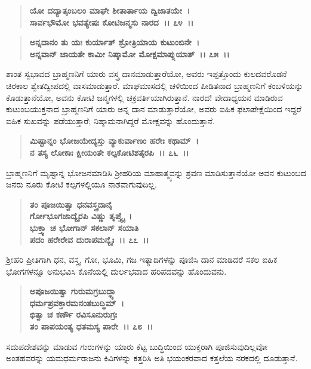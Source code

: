 \begin{verse}
\textbf{ಯೋ ದದ್ಯಾತ್ಕಂಬಲಂ ಮಾಘೇ ಶೀತಾರ್ತಾಯ ದ್ವಿಜಾತಯೇ~।}\\\textbf{ಸಾರ್ವಭೌಮೋ ಭವತ್ಯೇಷಃ ಕೋಟಿಜನ್ಮಸು ನಾರದ~।। ೭೪~।।} 
\end{verse}

\begin{verse}
\textbf{ಅನ್ನದಾನಂ ತು ಯಃ ಕುರ್ಯಾತ್ ಶ್ರೋತ್ರಿಯಾಯ ಕುಟುಂಬಿನೇ~।}\\\textbf{ಅನ್ನವಾನ್ ಜಾಯತೇ ಕಾಮೀ ನಿಷ್ಕಾಮೋ ಮೋಕ್ಷಮಾಪ್ನುಯಾತ್~।। ೭೫~।।}
\end{verse}

ಶಾಂತ ಸ್ವಭಾವದ ಬ್ರಾಹ್ಮಣನಿಗೆ ಯಾರು ವಸ್ತ್ರ ದಾನಮಾಡುತ್ತಾರೆಯೋ, ಅವರು ಇಪ್ಪತ್ತೊಂದು ಕುಲದವರೊಡನೆ ಚಿರಕಾಲ ಶ್ವೇತದ್ವೀಪದಲ್ಲಿ ವಾಸಮಾಡುತ್ತಾರೆ. ಮಾಘಮಾಸದಲ್ಲಿ ಚಳಿಯಿಂದ ಪೀಡಿತನಾದ ಬ್ರಾಹ್ಮಣನಿಗೆ ಕಂಬಳಿಯನ್ನು ಕೊಡುತ್ತಾನೆಯೋ, ಅವನು ಕೋಟಿ ಜನ್ಮಗಳಲ್ಲಿ ಚಕ್ರವರ್ತಿಯಾಗಿರುತ್ತಾನೆ. ನಾರದ! ವೇದಾಧ್ಯಯನ ಮಾಡಿರುವ ಕುಟುಂಬಯುಕ್ತನಾದ ಬ್ರಾಹ್ಮಣನಿಗೆ ಯಾರು ಅನ್ನ ದಾನ ಮಾಡುತ್ತಾರೆಯೋ, ಅವರು ಐಹಿಕ ಫಲಾಪೇಕ್ಷೆಯಿಂದ ಇದ್ದರೆ ಐಹಿಕ ಸುಖವನ್ನು ಪಡೆಯುತ್ತಾರೆ; ನಿಷ್ಕಾಮನಾಗಿದ್ದರೆ ಮೋಕ್ಷವನ್ನು ಹೊಂದುತ್ತಾನೆ.

\begin{verse}
\textbf{ಮಿಷ್ಟಾನ್ನಂ ಭೋಜಯೇದ್ಯಸ್ತು ವ್ಯಾಕುರ್ವಾಣಂ ಹರೇಃ ಕಥಾಮ್~।}\\\textbf{ನ ತಸ್ಯ ಲೋಕಾಃ ಕ್ಷೀಯಂತೇ ಕಲ್ಪಕೋಟಿಶತೈರಪಿ~।। ೭೬~।।}
\end{verse}

ಬ್ರಾಹ್ಮಣನಿಗೆ ಮೃಷ್ಟಾನ್ನ ಭೋಜನಮಾಡಿಸಿ ಶ‍್ರೀಹರಿಯ ಮಾಹಾತ್ಮ್ಯವನ್ನು ಶ್ರವಣ ಮಾಡಿಸುತ್ತಾನೆಯೋ ಅವನ ಕುಟುಂಬದ ಜನರು ನೂರು ಕೋಟಿ ಕಲ್ಪಗಳಲ್ಲಿಯೂ ನಾಶವಾಗುವುದಿಲ್ಲ.

\begin{verse}
\textbf{ತಂ ಪೂಜಯಿತ್ವಾ ಧನವಸ್ತ್ರದಾನೈ}\\\textbf{ರ್ಗೋಭೂಗಜಾದ್ಯೈರಪಿ ವಿಷ್ಣು ತೃಪ್ತ್ಯೈ~। }\\\textbf{ಭುಕ್ತ್ವಾ ಚ ಭೋಗಾನ್ ಸಕಲಾನ್ ಸಯಾತಿ} \\\textbf{ಪದಂ ಹರೇರೇವ ದುರಾಪಮನ್ಯೈಃ~।। ೭೭~।।}
\end{verse}

ಶ‍್ರೀಹರಿ ಪ್ರೀತಿಗಾಗಿ ಧನ, ವಸ್ತ್ರ, ಗೋ, ಭೂಮಿ, ಗಜ ಇತ್ಯಾದಿಗಳನ್ನು ಪೂಜಿಸಿ ದಾನ ಮಾಡಿದರೆ ಸಕಲ ಐಹಿಕ ಭೋಗಗಳನ್ನೂ ಅನುಭವಿಸಿ ಕೊನೆಯಲ್ಲಿ ದುರ್ಲಭವಾದ ಹರಿಪದವನ್ನು ಹೊಂದುವನು.

\begin{verse}
\textbf{ಅಪೂಜಯಿತ್ವಾ ಗುರುಮಗ್ರಬುದ್ಧ್ಯಾ}\\\textbf{ಧರ್ಮಪ್ರವಕ್ತಾರಮನಂತಬುದ್ಧಿಮ್~।}\\\textbf{ಛಿತ್ವಾ ಚ ಕರ್ಣೌ ರವಿಸೂನುರುಗ್ರಃ} \\\textbf{ತಂ ಪಾಪಯಂತ್ಯ ಧತಮಸ್ಯ ಪಾರೇ~।। ೭೮~।।}
\end{verse}

ಸದುಪದೇಶವನ್ನು ಮಾಡುವ ಗುರುಗಳನ್ನು ಯಾರು ಕೆಟ್ಟ ಬುದ್ಧಿಯಿಂದ ಯುಕ್ತರಾಗಿ ಪೂಜಿಸುವುದಿಲ್ಲವೋ ಅಂತಹವರನ್ನು ಯಮಧರ್ಮರಾಜನು ಕಿವಿಗಳನ್ನು ಕತ್ತರಿಸಿ ಅತಿ ಭಯಂಕರವಾದ ಕತ್ತಲೆಯ ನರಕದಲ್ಲಿ ದೂಡುತ್ತಾನೆ.

